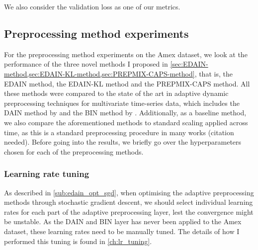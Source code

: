 \documentclass{statsmsc}
\begin{document}
{We also consider the validation loss as one of our metrics.


\subsection{Preprocessing method experiments}%
\label{sub:amex_res}

For the preprocessing method experiments on the Amex dataset, we look at the performance of
the three novel methods I proposed in \cref{sec:EDAIN-method,sec:EDAIN-KL-method,sec:PREPMIX-CAPS-method}, that is, the \ac{EDAIN} method, the \ac{EDAIN-KL} method and the \ac{PREPMIX-CAPS} method.
All these methods were compared to the state of the art in adaptive dynamic preprocessing techniques
for multivariate time-series data, which includes the \ac{DAIN} method by \cite{dain} and the
\ac{BIN} method by \cite{bin}. Additionally, as a baseline method, we also compare the
aforementioned methods to standard scaling applied across time, as this is a standard
preprocessing procedure in many works (citation needed).
Before going into the results, we briefly go over the hyperparameters chosen for each of the
preprocessing methods.

\subsubsection{Learning rate tuning}%
\label{ssub:Learning rate tuning}

As described in \cref{sub:edain_opt_sgd}, when optimising the adaptive preprocessing methods
through stochastic gradient descent, we should select individual learning rates for each part
of the adaptive preprocessing layer, lest the convergence might be unstable.
As the \ac{DAIN} and \ac{BIN} layer has never been applied to the Amex dataset, these learning
rates need to be manually tuned. The details of how I performed this tuning is found in
\cref{ch:lr_tuning}.

}
\end{document}
